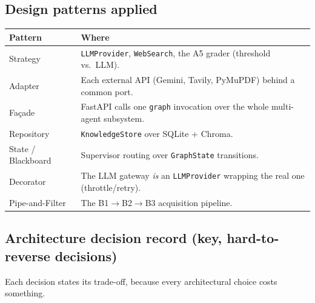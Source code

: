 \documentclass[11pt,a4paper]{article}
\begin{document}
\subsection{Design patterns applied}
\begin{center}
\begin{tabularx}{\linewidth}{@{}l Y@{}}
\toprule
\textbf{Pattern} & \textbf{Where} \\
\midrule
Strategy & \texttt{LLMProvider}, \texttt{WebSearch}, the A5 grader (threshold vs.\ LLM). \\
Adapter & Each external API (Gemini, Tavily, PyMuPDF) behind a common port. \\
Fa\c{c}ade & FastAPI calls one \texttt{graph} invocation over the whole multi-agent subsystem. \\
Repository & \texttt{KnowledgeStore} over SQLite + Chroma. \\
State / Blackboard & Supervisor routing over \texttt{GraphState} transitions. \\
Decorator & The LLM gateway \emph{is} an \texttt{LLMProvider} wrapping the real one (throttle/retry). \\
Pipe-and-Filter & The B1$\to$B2$\to$B3 acquisition pipeline. \\
\bottomrule
\end{tabularx}
\end{center}

\subsection{Architecture decision record (key, hard-to-reverse decisions)}
Each decision states its trade-off, because every architectural choice costs something.
\end{document}
